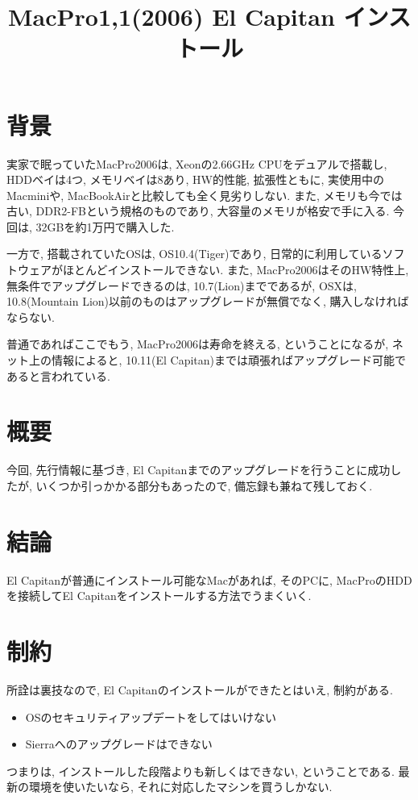 \documentclass{jsarticle}
\title{MacPro1,1(2006) El Capitan インストール}
\begin{document}
\maketitle

\section{背景}
実家で眠っていたMacPro2006は, Xeonの2.66GHz CPUをデュアルで搭載し, HDDベイは4つ, メモリベイは8あり, HW的性能, 拡張性ともに, 実使用中のMacminiや, MacBookAirと比較しても全く見劣りしない. 
また, メモリも今では古い, DDR2-FBという規格のものであり, 大容量のメモリが格安で手に入る. 今回は, 32GBを約1万円で購入した. 

一方で, 搭載されていたOSは, OS10.4(Tiger)であり, 日常的に利用しているソフトウェアがほとんどインストールできない. 
また, MacPro2006はそのHW特性上, 無条件でアップグレードできるのは, 10.7(Lion)までであるが, 
OSXは, 10.8(Mountain Lion)以前のものはアップグレードが無償でなく, 購入しなければならない. 

普通であればここでもう, MacPro2006は寿命を終える, ということになるが, ネット上の情報によると, 10.11(El Capitan)までは頑張ればアップグレード可能であると言われている. 

\section{概要}
今回, 先行情報に基づき, El Capitanまでのアップグレードを行うことに成功したが, いくつか引っかかる部分もあったので, 備忘録も兼ねて残しておく. 

\section{結論}
El Capitanが普通にインストール可能なMacがあれば, そのPCに, MacProのHDDを接続してEl Capitanをインストールする方法でうまくいく. 

\section{制約}
所詮は裏技なので, El Capitanのインストールができたとはいえ, 制約がある. 
\begin{itemize}
    \item OSのセキュリティアップデートをしてはいけない
    \item Sierraへのアップグレードはできない
\end{itemize}
つまりは, インストールした段階よりも新しくはできない, ということである. 
最新の環境を使いたいなら, それに対応したマシンを買うしかない. 
\end{document}
